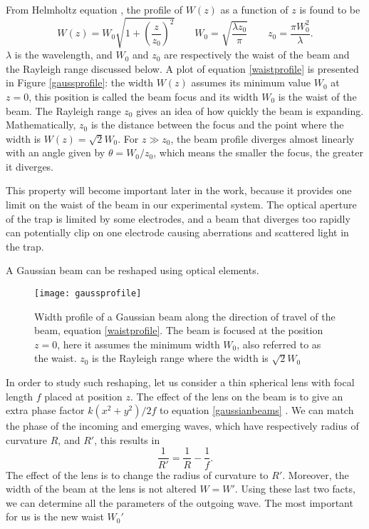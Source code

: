 From Helmholtz equation \cite{saleh}, the profile of $W(z)$ as a function of $z$ is found to be
\begin{equation}
\label{waistprofile}
W(z) = W_0 \sqrt{1 + \left(\frac{z}{z_0}\right)^2}\qquad W_0 = \sqrt{\frac{\lambda z_0}{\pi}} \qquad z_0 = \frac{\pi W_0^2}{\lambda}.
\end{equation}
$\lambda$ is the wavelength, and $W_0$ and $z_0$ are respectively the waist of the beam and the Rayleigh range discussed below. A plot of equation \eqref{waistprofile} is presented in Figure \eqref{gaussprofile}:
the width $W(z)$ assumes its minimum value $W_0$ at $z=0$, this position is called the beam focus and its width $W_0$ is the waist of the beam. The Rayleigh range $z_0$ gives an idea of how quickly the beam is expanding. Mathematically, $z_0$ is the distance between the focus and the point where the width is $W(z) = \sqrt{2}W_0$.
For $z \gg z_0$, the beam profile diverges almost linearly with an angle given by $\theta = W_0/z_0$, which means the smaller the focus, the greater it diverges.\par
This property will become important later in the work, because it provides one limit on the waist of the beam in our experimental system. The optical aperture of the trap is limited by some electrodes, and a beam that diverges too rapidly can potentially clip on one electrode causing aberrations and scattered light in the trap.\par
A Gaussian beam can be reshaped using optical elements.
\begin{figure}
\centering
\texttt{[image: gaussprofile]}
\caption{Width profile of a Gaussian beam along the direction of travel of the beam, equation \eqref{waistprofile}. The beam is focused at the position $z = 0$, here it assumes the minimum width $W_0$, also referred to as the waist. $z_0$ is the Rayleigh range where the width is $\sqrt{2}W_0$}
\label{gaussprofile}
\end{figure}
In order to study such reshaping, let us consider a thin spherical lens with focal length $f$ placed at position $z$. The effect of the lens on the beam is to give an extra phase factor $k(x^2 + y^2)/2f$ to equation \eqref{gaussianbeams} \cite{beamparameters}. We can match the phase of the incoming and emerging waves, which have respectively radius of curvature $R$, and $R'$, this results in
\begin{equation}
\frac{1}{R'} = \frac{1}{R} - \frac{1}{f}.
\end{equation}
The effect of the lens is to change the radius of curvature to $R'$. Moreover, the width of the beam at the lens is not altered $W=W'$. Using these last two facts, we can determine all the parameters of the outgoing wave. The most important for us is the new waist $W_0'$
